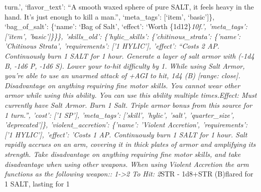 \documentclass[
  letterpaper,
  DIV=11,
  numbers=noendperiod]{scrartcl}
\begin{document}
turn.', `flavor\_text': ``A smooth waxed sphere of pure SALT, it feels
heavy in the hand. It's just enough to kill a man.'', `meta\_tags':
{[}`item', `basic'{]}\}, `bag\_of\_salt': \{`name': `Bag of Salt',
`effect': `Worth \{1d12\}\emph{10f.', 'meta\_tags': {[}'item',
'basic'{]}\}\}\}, 'skills\_old': \{'hylic\_skills':
\{'chitinous\_strata': \{'name': 'Chitinous Strata', 'requirements':
{[}'1 HYLIC'{]}, 'effect': ``Costs 2 AP. Continuously burn 1 SALT for 1
hour. Generate a layer of salt armor with (-1d4 B, -1d6 P, -1d6 S).
Lower your to-hit difficulty by 1. While using Salt Armor, you're able
to use an unarmed attack of +AGI to hit, 1d4 (B) {[}range: close{]}.
Disadvantage on anything requiring fine motor skills. You cannot wear
other armor while using this ability. You can use this ability multiple
times.\n\nFlare Effect: Must currently have Salt Armor. Burn 1 Salt.
Triple armor bonus from this source for 1 turn.'', 'cost': {[}'1 SP'{]},
'meta\_tags': {[}'skill', 'hylic', 'salt', 'quarter\_size',
'deprecated'{]}\}, 'violent\_accretion': \{'name': 'Violent Accretion',
'requirements': {[}'1 HYLIC'{]}, 'effect': 'Costs 1 AP. Continuously
burn 1 SALT for 1 hour. Salt rapidly accrues on an arm, covering it in
thick plates of armor and amplifying its strength. Take disadvantage on
anything requiring fine motor skills, and take disadvantage when using
other weapons. When using Violent Accretion the arm functions as the
following weapon:\n\nSpeed: 1-\textgreater2
To Hit: 2}STR \n- 1d8+STR (B)\nIf flared for 1 SALT, lasting for 1
\end{document}
